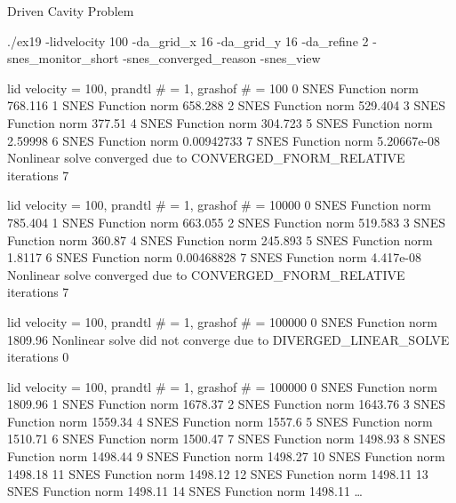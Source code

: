 \begin{frame}[fragile]{Driven Cavity Problem}

\smallskip
\begin{semiverbatim}\scriptsize
./ex19 -lidvelocity 100 
  -da\_grid\_x 16 -da\_grid\_y 16 -da\_refine 2 
  -snes\_monitor\_short -snes\_converged\_reason -snes\_view
\end{semiverbatim}
\smallskip
\begin{overprint}\scriptsize
{}
\begin{semiverbatim}
lid velocity = 100, prandtl # = 1, grashof # = 100
  0 SNES Function norm 768.116 
  1 SNES Function norm 658.288 
  2 SNES Function norm 529.404 
  3 SNES Function norm 377.51 
  4 SNES Function norm 304.723 
  5 SNES Function norm 2.59998 
  6 SNES Function norm 0.00942733 
  7 SNES Function norm 5.20667e-08 
Nonlinear solve converged due to CONVERGED_FNORM_RELATIVE iterations 7
\end{semiverbatim}
\begin{semiverbatim}
lid velocity = 100, prandtl # = 1, grashof # = 10000
  0 SNES Function norm 785.404 
  1 SNES Function norm 663.055 
  2 SNES Function norm 519.583 
  3 SNES Function norm 360.87 
  4 SNES Function norm 245.893 
  5 SNES Function norm 1.8117 
  6 SNES Function norm 0.00468828 
  7 SNES Function norm 4.417e-08 
Nonlinear solve converged due to CONVERGED_FNORM_RELATIVE iterations 7
\end{semiverbatim}
\begin{semiverbatim}
lid velocity = 100, prandtl # = 1, grashof # = 100000
  0 SNES Function norm 1809.96 
Nonlinear solve did not converge due to DIVERGED_LINEAR_SOLVE iterations 0
\end{semiverbatim}
\begin{semiverbatim}
lid velocity = 100, prandtl # = 1, grashof # = 100000
  0 SNES Function norm 1809.96 
  1 SNES Function norm 1678.37 
  2 SNES Function norm 1643.76 
  3 SNES Function norm 1559.34 
  4 SNES Function norm 1557.6 
  5 SNES Function norm 1510.71 
  6 SNES Function norm 1500.47 
  7 SNES Function norm 1498.93 
  8 SNES Function norm 1498.44 
  9 SNES Function norm 1498.27 
 10 SNES Function norm 1498.18 
 11 SNES Function norm 1498.12 
 12 SNES Function norm 1498.11 
 13 SNES Function norm 1498.11 
 14 SNES Function norm 1498.11 
 \ldots
\end{semiverbatim}
\end{overprint}
\end{frame}
